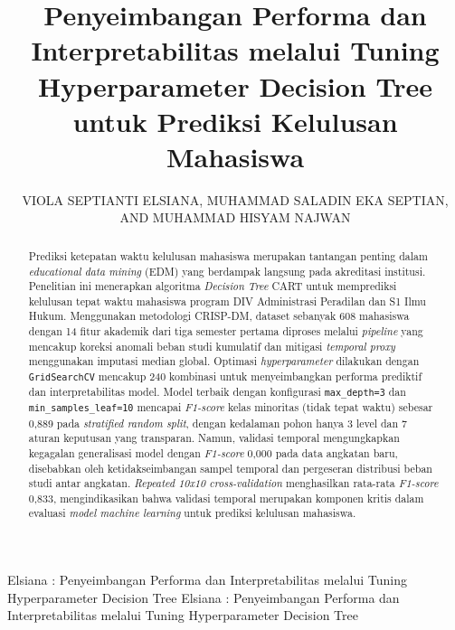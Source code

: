 \documentclass{ieeeaccess}
\begin{document}

\title{Penyeimbangan Performa dan Interpretabilitas melalui Tuning Hyperparameter Decision Tree untuk Prediksi Kelulusan Mahasiswa}
\author{\uppercase{Viola Septianti Elsiana},
\uppercase{Muhammad Saladin Eka Septian}, AND
\uppercase{Muhammad Hisyam Najwan}}

\address[1]{Program Studi DIV Teknik Informatika, Universitas Logistik dan Bisnis Internasional (ULBI), Bandung 40151, Indonesia (e-mail: \{714230001\}@std.ulbi.ac.id)}

\markboth
{Elsiana \headeretal: Penyeimbangan Performa dan Interpretabilitas melalui Tuning Hyperparameter Decision Tree}
{Elsiana \headeretal: Penyeimbangan Performa dan Interpretabilitas melalui Tuning Hyperparameter Decision Tree}



\begin{abstract}
Prediksi ketepatan waktu kelulusan mahasiswa merupakan tantangan penting dalam \emph{educational data mining} (EDM) yang berdampak langsung pada akreditasi institusi. Penelitian ini menerapkan algoritma \emph{Decision Tree} CART untuk memprediksi kelulusan tepat waktu mahasiswa program DIV Administrasi Peradilan dan S1 Ilmu Hukum. Menggunakan metodologi CRISP-DM, dataset sebanyak 608 mahasiswa dengan 14 fitur akademik dari tiga semester pertama diproses melalui \emph{pipeline} yang mencakup koreksi anomali beban studi kumulatif dan mitigasi \emph{temporal proxy} menggunakan imputasi median global. Optimasi \emph{hyperparameter} dilakukan dengan \texttt{GridSearchCV} mencakup 240 kombinasi untuk menyeimbangkan performa prediktif dan interpretabilitas model. Model terbaik dengan konfigurasi \texttt{max\_depth=3} dan \texttt{min\_samples\_leaf=10} mencapai \emph{F1-score} kelas minoritas (tidak tepat waktu) sebesar 0,889 pada \emph{stratified random split}, dengan kedalaman pohon hanya 3 level dan 7 aturan keputusan yang transparan. Namun, validasi temporal mengungkapkan kegagalan generalisasi model dengan \emph{F1-score} 0,000 pada data angkatan baru, disebabkan oleh ketidakseimbangan sampel temporal dan pergeseran distribusi beban studi antar angkatan. \emph{Repeated 10x10 cross-validation} menghasilkan rata-rata \emph{F1-score} 0,833, mengindikasikan bahwa validasi temporal merupakan komponen kritis dalam evaluasi \emph{model machine learning} untuk prediksi kelulusan mahasiswa.
\end{abstract}
\end{document}
